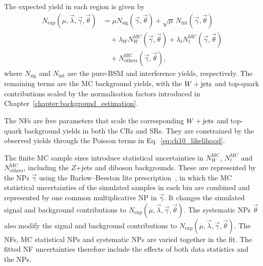 
The expected yield in each region is given by
\begin{align}
 N_{\mathrm{exp}}(\mu,\vec{\lambda},\vec{\gamma},\vec{\theta})
 &=\mu N_{\mathrm{sig}}(\vec{\gamma},\vec{\theta})
   +\sqrt{\mu}\,N_{\mathrm{int}}(\vec{\gamma},\vec{\theta})
   \nonumber\\
 &\quad+\lambda_W N_W^{\mathrm{MC}}(\vec{\gamma},\vec{\theta})
   +\lambda_t N_t^{\mathrm{MC}}(\vec{\gamma},\vec{\theta})
   \nonumber\\
 &\quad+N_{\mathrm{others}}^{\mathrm{MC}}(\vec{\gamma},\vec{\theta}),
 \label{eq:ch10_expected_yield}
\end{align}
where $N_{\mathrm{sig}}$ and $N_{\mathrm{int}}$ are the pure-BSM and interference yields, respectively. The remaining terms are the MC background yields, with the $W+\mathrm{jets}$ and top-quark contributions scaled by the normalisation factors introduced in Chapter~\ref{chapter:background_estimation}.

The NFs are free parameters that scale the corresponding $W+\mathrm{jets}$ and top-quark background yields in both the CRs and SRs.
They are constrained by the observed yields through the Poisson terms in Eq.~\eqref{eq:ch10_likelihood}.

The finite MC sample sizes introduce statistical uncertainties in $N_W^{\mathrm{MC}}$, $N_t^{\mathrm{MC}}$ and $N_{\mathrm{others}}^{\mathrm{MC}}$, including the $Z$+jets and diboson backgrounds.
These are represented by the NPs $\vec{\gamma}$ using the Barlow--Beeston lite prescription~\cite{Conway:2011in}, in which the MC statistical uncertainties of the simulated samples in each bin are combined and represented by one common multiplicative NP in $\vec{\gamma}$.
It changes the simulated signal and background contributions to $N_{\mathrm{exp}}(\mu,\vec{\lambda},\vec{\gamma},\vec{\theta})$.
The systematic NPs $\vec{\theta}$ also modify the signal and background contributions to $N_{\mathrm{exp}}(\mu,\vec{\lambda},\vec{\gamma},\vec{\theta})$.
The NFs, MC statistical NPs and systematic NPs are varied together in the fit. The fitted NF uncertainties therefore include the effects of both data statistics and the NPs.

